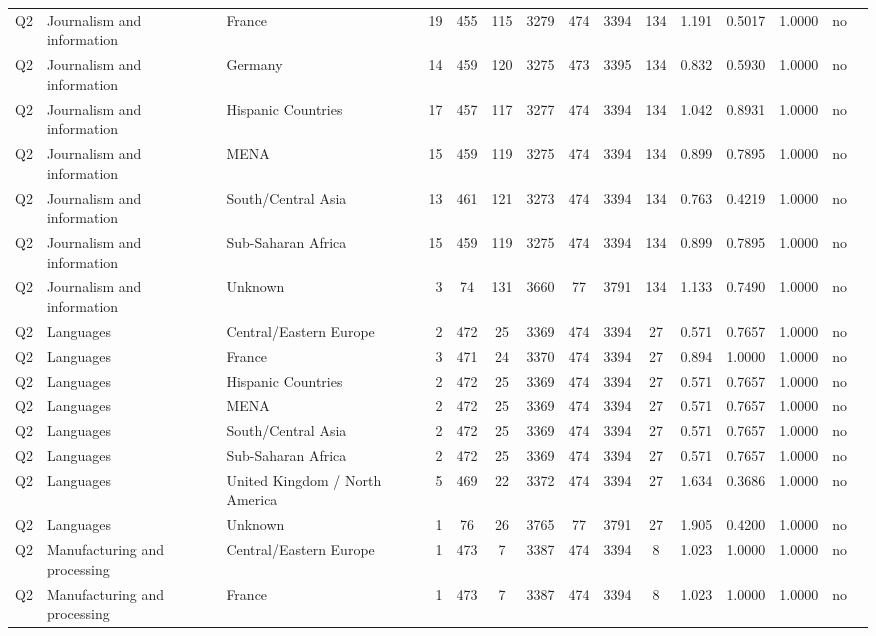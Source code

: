 \begin{longtable}{lllrcccccccccll}
Q2 & Journalism and information & France & 19 & 455 & 115 & 3279 & 474 & 3394 & 134 & 1.191 & 0.5017 & 1.0000 & no \\
Q2 & Journalism and information & Germany & 14 & 459 & 120 & 3275 & 473 & 3395 & 134 & 0.832 & 0.5930 & 1.0000 & no \\
Q2 & Journalism and information & Hispanic Countries & 17 & 457 & 117 & 3277 & 474 & 3394 & 134 & 1.042 & 0.8931 & 1.0000 & no \\
Q2 & Journalism and information & MENA & 15 & 459 & 119 & 3275 & 474 & 3394 & 134 & 0.899 & 0.7895 & 1.0000 & no \\
Q2 & Journalism and information & South/Central Asia & 13 & 461 & 121 & 3273 & 474 & 3394 & 134 & 0.763 & 0.4219 & 1.0000 & no \\
Q2 & Journalism and information & Sub-Saharan Africa & 15 & 459 & 119 & 3275 & 474 & 3394 & 134 & 0.899 & 0.7895 & 1.0000 & no \\
Q2 & Journalism and information & Unknown & 3 & 74 & 131 & 3660 & 77 & 3791 & 134 & 1.133 & 0.7490 & 1.0000 & no \\
Q2 & Languages & Central/Eastern Europe & 2 & 472 & 25 & 3369 & 474 & 3394 & 27 & 0.571 & 0.7657 & 1.0000 & no \\
Q2 & Languages & France & 3 & 471 & 24 & 3370 & 474 & 3394 & 27 & 0.894 & 1.0000 & 1.0000 & no \\
Q2 & Languages & Hispanic Countries & 2 & 472 & 25 & 3369 & 474 & 3394 & 27 & 0.571 & 0.7657 & 1.0000 & no \\
Q2 & Languages & MENA & 2 & 472 & 25 & 3369 & 474 & 3394 & 27 & 0.571 & 0.7657 & 1.0000 & no \\
Q2 & Languages & South/Central Asia & 2 & 472 & 25 & 3369 & 474 & 3394 & 27 & 0.571 & 0.7657 & 1.0000 & no \\
Q2 & Languages & Sub-Saharan Africa & 2 & 472 & 25 & 3369 & 474 & 3394 & 27 & 0.571 & 0.7657 & 1.0000 & no \\
Q2 & Languages & United Kingdom / North America & 5 & 469 & 22 & 3372 & 474 & 3394 & 27 & 1.634 & 0.3686 & 1.0000 & no \\
Q2 & Languages & Unknown & 1 & 76 & 26 & 3765 & 77 & 3791 & 27 & 1.905 & 0.4200 & 1.0000 & no \\
Q2 & Manufacturing and processing & Central/Eastern Europe & 1 & 473 & 7 & 3387 & 474 & 3394 & 8 & 1.023 & 1.0000 & 1.0000 & no \\
Q2 & Manufacturing and processing & France & 1 & 473 & 7 & 3387 & 474 & 3394 & 8 & 1.023 & 1.0000 & 1.0000 & no \\

\end{longtable}
